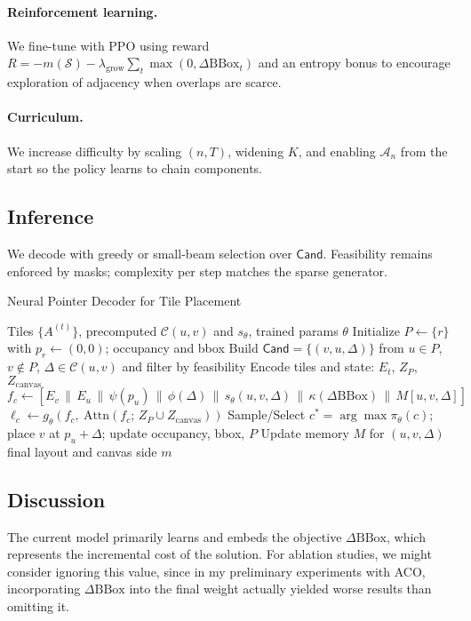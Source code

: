 \documentclass[11pt]{article}
\begin{document}
\paragraph{Reinforcement learning.}
We fine-tune with PPO using reward $R=-m(\mathcal{S}) - \lambda_{\text{grow}}\!\sum_t \max(0,\Delta \mathrm{BBox}_t)$
and an entropy bonus to encourage exploration of adjacency when overlaps are scarce.

\paragraph{Curriculum.}
We increase difficulty by scaling $(n,T)$, widening $K$, and enabling $\mathcal{A}_n$
from the start so the policy learns to chain components.

\subsection{Inference}
We decode with greedy or small-beam selection over $\mathsf{Cand}$.
Feasibility remains enforced by masks; complexity per step matches the sparse generator.

\begin{algorithm}[H]
\caption{Neural Pointer Decoder for Tile Placement}
\begin{algorithmic}[1]
\Require Tiles $\{A^{(t)}\}$, precomputed $\mathcal{C}(u,v)$ and $s_\theta$, trained params $\theta$
\State Initialize $P\gets\{r\}$ with $p_r\gets(0,0)$; occupancy and bbox
  \State Build $\mathsf{Cand}=\{(v,u,\Delta)\}$ from $u\in P$, $v\notin P$, $\Delta\in\mathcal{C}(u,v)$ and filter by feasibility
  \State Encode tiles and state: $E_t$, $Z_P$, $Z_{\text{canvas}}$
     \State $f_c\gets [E_v\,\|\,E_u\,\|\,\psi(p_u)\,\|\,\phi(\Delta)\,\|\,s_\theta(u,v,\Delta)\,\|\,\kappa(\Delta\mathrm{BBox})\,\|\,M[u,v,\Delta]]$
     \State $\ell_c \gets g_\theta\!\left(f_c,\ \mathrm{Attn}\!\left(f_c;\,Z_P \cup Z_{\text{canvas}}\right)\right)$
  \EndFor
  \State Sample/Select $c^*=\arg\max \pi_\theta(c)$; place $v$ at $p_u+\Delta$; update occupancy, bbox, $P$
  \State Update memory $M$ for $(u,v,\Delta)$
\EndWhile
\State \Return final layout and canvas side $m$
\end{algorithmic}
\end{algorithm}

\subsection{Discussion}
The current model primarily learns and embeds the objective $\Delta\mathrm{BBox}$, which represents the incremental cost of the solution. For ablation studies, we might consider ignoring this value, since in my preliminary experiments with ACO, incorporating $\Delta\mathrm{BBox}$ into the final weight actually yielded worse results than omitting it.
\end{document}
